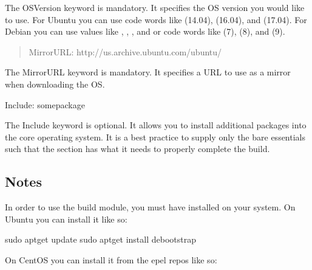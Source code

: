 \documentclass[letterpaper,10pt,english]{sphinxmanual}
\begin{document}
The OSVersion keyword is mandatory. It specifies the OS version you would like to use. For Ubuntu you can use code words like  (14.04),  (16.04),
and  (17.04). For Debian you can use values like , , , and  or code words like  (7),  (8), and  (9).
\begin{quote}

%
\begin{sphinxVerbatim}[commandchars=\\\{\}]
MirrorURL:  http://us.archive.ubuntu.com/ubuntu/
\end{sphinxVerbatim}
\end{quote}

The MirrorURL keyword is mandatory. It specifies a URL to use as a mirror when downloading the OS.

%
\begin{sphinxVerbatim}[commandchars=\\\{\}]
Include: somepackage
\end{sphinxVerbatim}

The Include keyword is optional. It allows you to install additional packages into the core operating system. It is a best practice to supply only the bare essentials
such that the  section has what it needs to properly complete the build.


\subsection{Notes}
\label{\detokenize{appendix:id17}}
In order to use the  build module, you must have  installed on your system. On Ubuntu you can install it like so:

%
\begin{sphinxVerbatim}[commandchars=\\\{\}]
\PYGZdl{} sudo apt\PYGZhy{}get update \PYGZam{}\PYGZam{} sudo apt\PYGZhy{}get install debootstrap
\end{sphinxVerbatim}

On CentOS you can install it from the epel repos like so:
\end{document}
